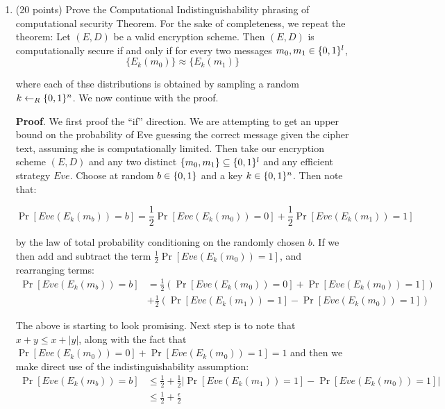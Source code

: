 \documentclass{article}
\begin{document}
\begin{enumerate}[,start=6]%

\item{}
(20 points) Prove the Computational Indistinguishability phrasing of computational security Theorem.
For the sake of completeness, we repeat the theorem: Let $(E,D)$ be a valid encryption scheme. Then $(E,D)$ 
is computationally secure if and only if for every two messages $m_0,m_1 \in \{0,1\}^l$,%
\noindent\noindent\[%
\{E_k(m_0)\} \approx \{E_k(m_1)\}
\]%

where each of thse distributions is obtained by sampling a random $k \gets_R \{0,1\}^n$. We now continue with 
the proof.%

\begin{mdbmarginx}{1ex}{0pt}{1ex}{0pt}%
\noindent{}\textbf{Proof}.  We first proof the \textquotedblleft{}if\textquotedblright{} direction. We are attempting to get an upper bound on the probability of Eve
guessing the correct message given the cipher text, assuming she is computationally limited. Then take
our encryption scheme $(E,D)$ and any two distinct $\{m_0, m_1\} \subseteq \{0,1\}^l$ and any efficient 
strategy $Eve$. Choose at random $b \in \{0,1\}$ and a key $k \in \{0,1\}^n$. Then note that:%
\end{mdbmarginx}%
\noindent\noindent\[%
\Pr[Eve(E_k(m_b)) = b] = \frac{1}{2}\Pr[Eve(E_k(m_0)) = 0] + \frac{1}{2}\Pr[Eve(E_k(m_1)) = 1]
\]%

by the law of total probability conditioning on the randomly chosen $b$. If we then add and subtract 
the term $\frac{1}{2}\Pr[Eve(E_k(m_0)) = 1]$, and rearranging terms:%
\noindent\noindent\[%
\begin{aligned}
\Pr[Eve(E_k(m_b)) = b] &= \frac{1}{2} (\Pr[Eve(E_k(m_0)) = 0] + \Pr[Eve(E_k(m_0)) = 1]) \\
&+\frac{1}{2}(\Pr[Eve(E_k(m_1)) = 1] - \Pr[Eve(E_k(m_0)) = 1])
\end{aligned}
\]%

The above is starting to look promising. Next step is to note that $x + y \leq x + |y|$, along with the
fact that $\Pr[Eve(E_k(m_0)) = 0] + \Pr[Eve(E_k(m_0)) = 1] = 1$ and then we make direct use of the 
indistinguishability assumption:%
\noindent\noindent\[%
\begin{aligned}
\Pr[Eve(E_k(m_b)) = b] &\leq \frac{1}{2} + \frac{1}{2}|\Pr[Eve(E_k(m_1)) = 1] - \Pr[Eve(E_k(m_0)) = 1]| \\
&\leq \frac{1}{2} + \frac{\epsilon}{2} 
\end{aligned}
\]%


\end{enumerate}
\end{document}
